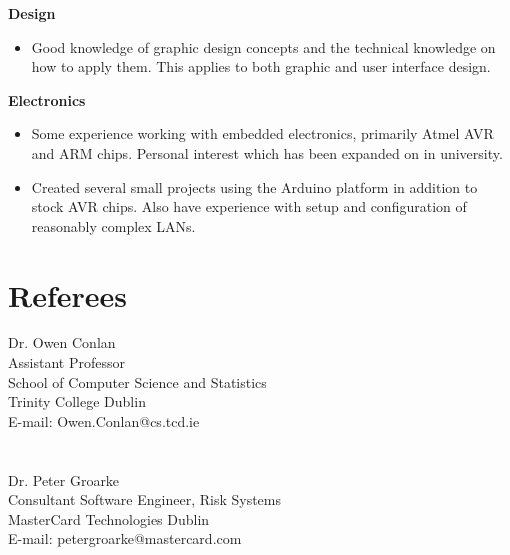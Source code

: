 \documentclass{res}
\begin{document}
\begin{resume}
  {\bf Design} 
        \begin{itemize}
        \item Good knowledge of graphic design concepts and the technical knowledge on how to apply them. This applies to both graphic and user interface design.
       \end{itemize}

   {\bf  Electronics} 
        \begin{itemize}
        \item  Some experience working with embedded electronics, primarily Atmel AVR and ARM chips. Personal interest which has been expanded on in university. 
        \item Created several small projects using the Arduino platform in addition to stock AVR chips. Also have experience with setup and configuration of reasonably complex LANs.
       \end{itemize} 

 
\section{Referees}
\vspace{0.1in} 
 
   Dr. Owen Conlan\\
   Assistant Professor\\
   School of Computer Science and Statistics\\
   Trinity College Dublin\\
   E-mail: Owen.Conlan@cs.tcd.ie\\
   \\
   \\
   Dr. Peter Groarke\\
   Consultant Software Engineer, Risk Systems\\
   MasterCard Technologies Dublin\\
   E-mail: peter\textunderscore groarke@mastercard.com\\
  



    
 

\end{resume}
\end{document}
